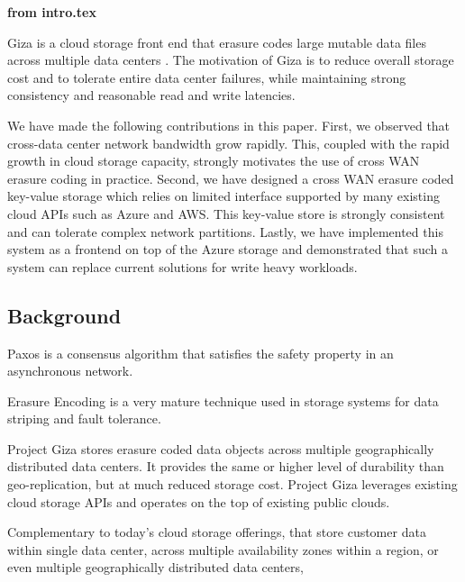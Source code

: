 {\bf from intro.tex}

Giza is a cloud storage front end that erasure codes large mutable data files across multiple data centers . The motivation of Giza is to reduce overall storage cost and to tolerate entire data center failures, while maintaining strong consistency and reasonable read and write latencies.

\par
We have made the following contributions in this paper. First, we observed that cross-data center network bandwidth grow rapidly. This, coupled with the rapid growth in cloud storage capacity, strongly motivates the use of cross WAN erasure coding in practice. Second, we have designed a cross WAN erasure coded key-value storage which relies on limited interface supported by many existing cloud APIs such as Azure and AWS. This key-value store is strongly consistent and can tolerate complex network partitions. Lastly, we have implemented this system as a frontend on top of the Azure storage and demonstrated that such a system can replace current solutions for write heavy workloads.

\subsection{Background}
Paxos is a consensus algorithm that satisfies the safety property in an asynchronous network. 
\par
Erasure Encoding is a very mature technique used in storage systems for data striping and fault tolerance.

Project Giza stores erasure coded data objects across multiple geographically distributed data centers. It provides the same or higher level of durability than geo-replication, but at much reduced storage cost. Project Giza leverages existing cloud storage APIs and operates on the top of existing public clouds.


Complementary to today's cloud storage offerings, that store customer data within single data center, across multiple availability zones within a region, or even multiple geographically distributed data centers,